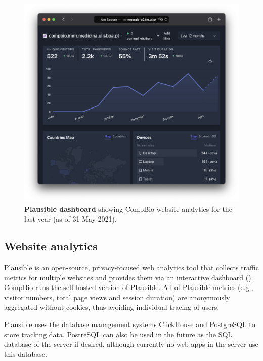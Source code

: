 \begin{figure}
  \vspace{-4\intextsep}
  \includegraphics[width=\linewidth]{images/app-server/plausible}
  \caption[Plausible dashboard]{\textbf{Plausible dashboard} showing CompBio website analytics for the last year (as of 31 May 2021).}
  \label{fig:plausible}
  \vspace{-1\intextsep}
\end{figure}

\subsection{Website analytics}

Plausible is an open-source, privacy-focused web analytics tool that collects traffic metrics for multiple websites and provides them via an interactive dashboard (). CompBio runs the self-hosted version of Plausible. All of Plausible metrics (e.g., visitor numbers, total page views and session duration) are anonymously aggregated without cookies, thus avoiding individual tracing of users.

Plausible uses the database management systems ClickHouse and PostgreSQL to store tracking data. PostreSQL can also be used in the future as the SQL database of the server if desired, although currently no web apps in the server use this database.


